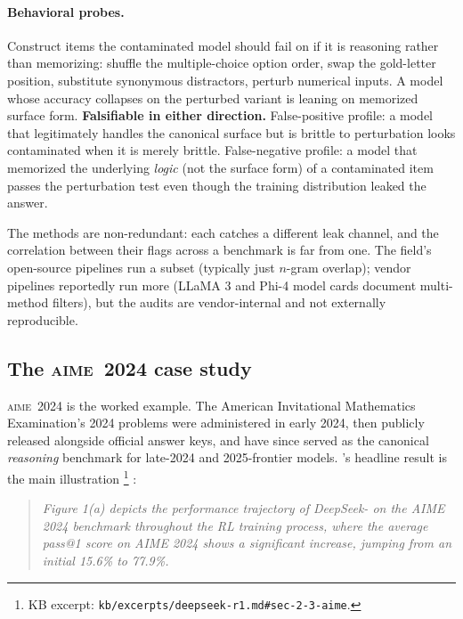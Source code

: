\paragraph{Behavioral probes.} Construct items the contaminated model
should fail on if it is reasoning rather than memorizing: shuffle the
multiple-choice option order, swap the gold-letter position,
substitute synonymous distractors, perturb numerical inputs.
A model whose accuracy collapses on the perturbed variant is leaning
on memorized surface form. \textbf{Falsifiable in either direction.}
False-positive profile: a model that legitimately handles the
canonical surface but is brittle to perturbation looks contaminated
when it is merely brittle. False-negative profile: a model that
memorized the underlying \emph{logic} (not the surface form) of a
contaminated item passes the perturbation test even though the
training distribution leaked the answer.

The methods are non-redundant: each catches a different leak channel,
and the correlation between their flags across a benchmark is far
from one. The field's open-source  pipelines run a
subset (typically just $n$-gram overlap); vendor pipelines reportedly
run more (LLaMA 3 and Phi-4 model cards document multi-method
filters), but the audits are vendor-internal and not externally
reproducible.

\subsection{The \textsc{aime~2024} case study}
\label{sec:contamination-aime}

\textsc{aime~2024} is the worked example. The American Invitational
Mathematics Examination's 2024 problems were administered in early
2024, then publicly released alongside official answer keys, and have
since served as the canonical \emph{reasoning} benchmark for late-2024
and 2025-frontier models. \citet{deepseek-r1}'s headline result is
the main illustration%
\footnote{KB excerpt: \nolinkurl{kb/excerpts/deepseek-r1.md#sec-2-3-aime}.}
\citep[\S{}2.3]{deepseek-r1}:

\begin{quote}\itshape
Figure 1(a) depicts the performance trajectory of DeepSeek- on
the AIME 2024 benchmark throughout the RL training process, where the
average pass@1 score on AIME 2024 shows a significant increase,
jumping from an initial 15.6\% to 77.9\%.
\end{quote}

